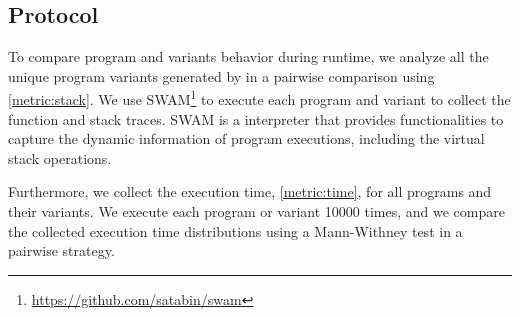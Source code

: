\subsection{Protocol}

To compare program and variants behavior during runtime, we analyze all the unique program variants generated by \tool in a pairwise comparison using \autoref{metric:stack}. We use SWAM\footnote{\url{https://github.com/satabin/swam}} to execute each program and variant to collect the function and stack traces. SWAM is a \wasm interpreter that provides functionalities to capture the dynamic information of \wasm program executions, including the virtual stack operations.

Furthermore, we collect the execution time, \autoref{metric:time}, for all programs and their variants. We execute each program or variant 10000 times, and we compare the collected execution time distributions using a Mann-Withney test \citationneeded in a pairwise strategy.

\pagebreak
 